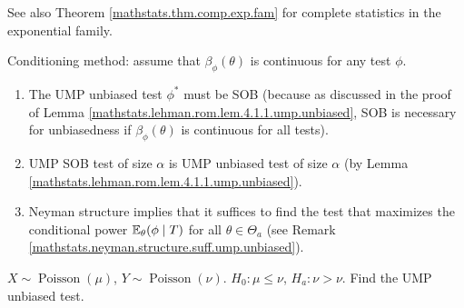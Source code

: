 See also Theorem \ref{mathstats.thm.comp.exp.fam} for complete statistics in the exponential family.



Conditioning method: assume that \(\beta_\phi(\theta)\) is continuous for any test \(\phi\). 

\begin{enumerate}[(1)]

\item The UMP unbiased test \(\phi^*\) must be SOB (because as discussed in the proof of Lemma \ref{mathstats.lehman.rom.lem.4.1.1.ump.unbiased}, SOB is necessary for unbiasedness if \(\beta_\phi(\theta)\) is continuous for all tests).

\item UMP SOB test of size \(\alpha\) is UMP unbiased test of size \(\alpha\) (by Lemma \ref{mathstats.lehman.rom.lem.4.1.1.ump.unbiased}). 

\item Neyman structure implies that it suffices to find the test that maximizes the conditional power \(\E_\theta(\phi \mid T) \) for all \(\theta \in \Theta_a\) (see Remark \ref{mathstats.neyman.structure.suff.ump.unbiased}).

\end{enumerate}

\begin{example}

\(X \sim \operatorname{Poisson}(\mu)\), \(Y \sim \operatorname{Poisson}(\nu)\). \(H_0: \mu \leq \nu\), \(H_a: \nu > \nu\). Find the UMP unbiased test.

\end{example}

